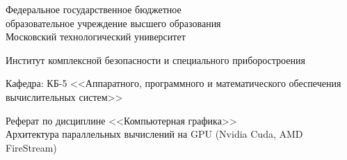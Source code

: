 \begin{titlepage}
\begin{center} %

\bfseries

	{\Large Федеральное государственное бюджетное \\
          образовательное учреждение высшего образования \\
          Московский технологический университет	
	} %

\vspace{48pt}


	{\large 
	  Институт комплексной безопасности и специального приборостроения
	}


\vspace{36pt}


	{\large  {\comic Кафедра: КБ-5 <<Аппаратного, программного и математического обеспечения вычислительных систем>>}
	
	} %

\vspace{48pt}

{\large	\DoloresCyr Реферат по дисциплине <<Компьютерная графика>> \\
  \LARGE{Архитектура параллельных вычислений на GPU (Nvidia Cuda, AMD FireStream)}
	
	}

\vspace{12pt}


\end{center} %

\vspace{60pt}


\end{titlepage}
